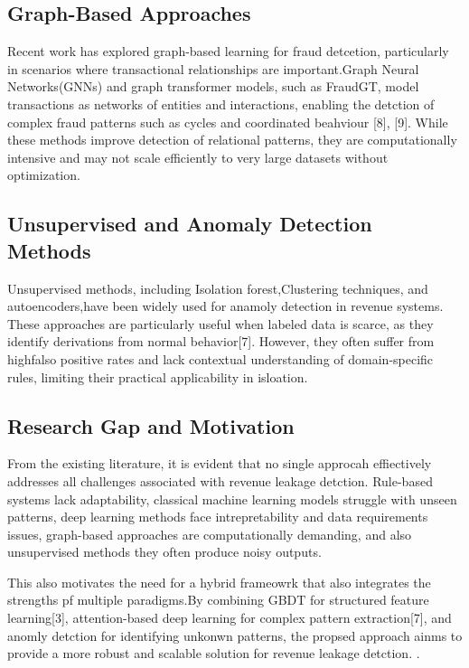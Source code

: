 \documentclass[conference]{IEEEtran}
\begin{document}
\subsection{Graph-Based Approaches}
Recent work has explored graph-based learning for fraud detcetion, particularly in scenarios where transactional relationships are important.Graph Neural Networks(GNNs) and graph transformer models, such as FraudGT, model transactions as networks of entities and interactions, enabling the detction of complex fraud patterns such as cycles and coordinated beahviour [8], [9]. While these methods improve detection of relational patterns, they are computationally intensive and may not scale efficiently to very large datasets without optimization.


\subsection{Unsupervised and Anomaly Detection Methods}
Unsupervised methods, including Isolation forest,Clustering techniques, and autoencoders,have been widely used for anamoly detection in revenue systems. These approaches are particularly useful when labeled data is scarce, as they identify derivations from normal behavior[7]. However, they often suffer from highfalso positive rates and lack contextual understanding of domain-specific rules, limiting their practical applicability in isloation.

\subsection{Research Gap and Motivation}
From the existing literature, it is evident that no single approcah effiectively addresses all challenges associated with revenue leakage detction. Rule-based systems lack adaptability, classical machine learning models struggle with unseen patterns, deep learning methods face intrepretability and data requirements issues, graph-based approaches are computationally demanding, and also unsupervised methods they often produce noisy outputs.

This also motivates the need for a hybrid frameowrk that also integrates the strengths pf multiple paradigms.By combining GBDT for structured feature learning[3], attention-based deep learning for complex pattern extraction[7], and anomly detction for identifying unkonwn patterns, the propsed approach ainms to provide a more robust and scalable solution for revenue leakage detction.
.
\end{document}
